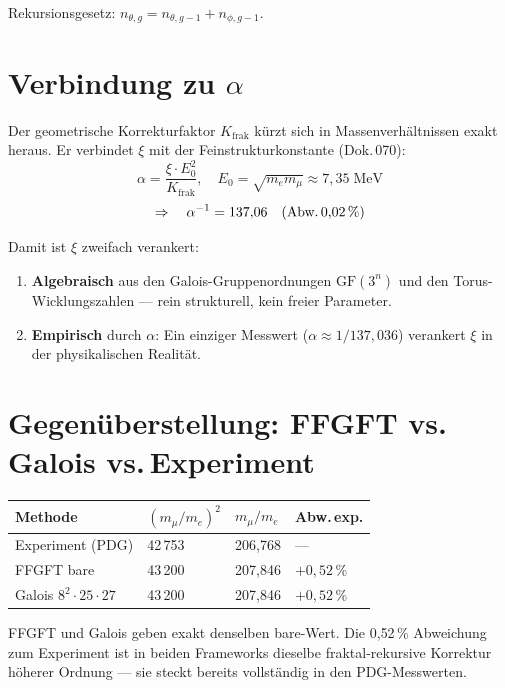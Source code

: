 Rekursionsgesetz: $n_{\theta,g} = n_{\theta,g-1} + n_{\phi,g-1}$.

\section{Verbindung zu \texorpdfstring{$\alpha$}{alpha}}

Der geometrische Korrekturfaktor $K_\mathrm{frak}$ kürzt sich in
Massenverhältnissen exakt heraus. Er verbindet $\xi$ mit der
Feinstrukturkonstante (Dok.\,070):
\[
  \alpha = \frac{\xi \cdot E_0^2}{K_\mathrm{frak}}, \quad
  E_0 = \sqrt{m_e m_\mu} \approx 7{,}35\;\text{MeV}
\]
\[
  \Rightarrow\quad \alpha^{-1} = 137{,}06 \quad (\text{Abw.\,0{,}02\,\%})
\]

Damit ist $\xi$ zweifach verankert:
\begin{enumerate}
  \item \textbf{Algebraisch} aus den Galois-Gruppenordnungen $\mathrm{GF}(3^n)$
    und den Torus-Wicklungszahlen --- rein strukturell, kein freier Parameter.
  \item \textbf{Empirisch} durch $\alpha$: Ein einziger Messwert
    ($\alpha \approx 1/137{,}036$) verankert $\xi$ in der physikalischen Realität.
\end{enumerate}

\section{Gegenüberstellung: FFGFT vs.\,Galois vs.\,Experiment}

\begin{center}
\begingroup\small
\begin{tabular}{@{}p{3.5cm}p{1.5cm}p{1.8cm}p{1.8cm}@{}}
\toprule
Methode & $(m_\mu/m_e)^2$ & $m_\mu/m_e$ & Abw.\,exp. \\
\midrule
Experiment (PDG) & 42\,753 & 206{,}768 & --- \\
FFGFT bare & 43\,200 & 207{,}846 & $+0{,}52$\,\% \\
Galois $8^2\cdot25\cdot27$ & 43\,200 & 207{,}846 & $+0{,}52$\,\% \\
\bottomrule
\end{tabular}
\endgroup
\end{center}

FFGFT und Galois geben exakt denselben bare-Wert. Die 0{,}52\,\%
Abweichung zum Experiment ist in beiden Frameworks dieselbe fraktal-rekursive
Korrektur höherer Ordnung --- sie steckt bereits vollständig in den
PDG-Messwerten.

